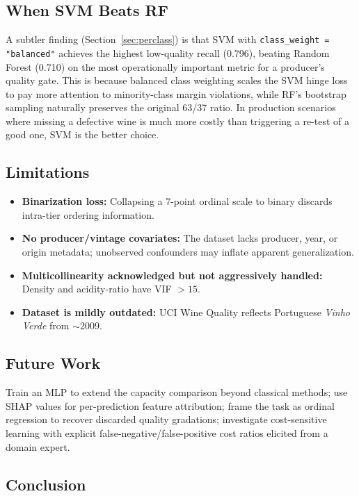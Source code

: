 \documentclass[conference]{IEEEtran}
\begin{document}
\subsection{When SVM Beats RF}

A subtler finding (Section~\ref{sec:perclass}) is that SVM with
\texttt{class\_weight = "balanced"} achieves the highest low-quality
recall (0.796), beating Random Forest (0.710) on the most operationally
important metric for a producer's quality gate. This is because
balanced class weighting scales the SVM hinge loss to pay more attention
to minority-class margin violations, while RF's bootstrap sampling
naturally preserves the original 63/37 ratio. In production scenarios
where missing a defective wine is much more costly than triggering a
re-test of a good one, SVM is the better choice.

\subsection{Limitations}

\begin{itemize}
\item \textbf{Binarization loss:} Collapsing a 7-point ordinal scale to
binary discards intra-tier ordering information.
\item \textbf{No producer/vintage covariates:} The dataset lacks
producer, year, or origin metadata; unobserved confounders may inflate
apparent generalization.
\item \textbf{Multicollinearity acknowledged but not aggressively
handled:} Density and acidity-ratio have VIF $> 15$.
\item \textbf{Dataset is mildly outdated:} UCI Wine Quality reflects
Portuguese \emph{Vinho Verde} from $\sim$2009.
\end{itemize}

\subsection{Future Work}

Train an MLP to extend the capacity comparison beyond classical
methods; use SHAP values for per-prediction feature attribution; frame
the task as ordinal regression to recover discarded quality
gradations; investigate cost-sensitive learning with explicit
false-negative/false-positive cost ratios elicited from a domain
expert.

\subsection{Conclusion}
\end{document}
